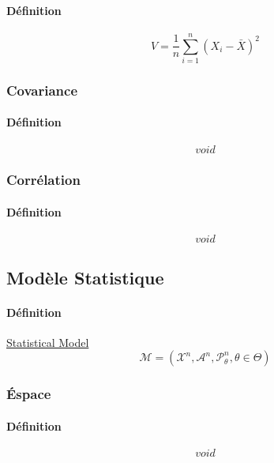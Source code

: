 \documentclass{article}
\begin{document}
\paragraph{Définition}
\begin{equation}
    \boxed{
        V = \frac{1}{n} \sum^{n}_{i=1} (X_{i} - \bar{X})^{2}
    }
\end{equation}

\subsubsection{Covariance}
\paragraph{Définition}
\begin{equation}
    \boxed{
        void
    }
\end{equation}

\subsubsection{Corrélation}
\paragraph{Définition}
\begin{equation}
    \boxed{
        void
    }
\end{equation}


\subsection{Modèle Statistique}
\paragraph{Définition} \href{https://en.wikipedia.org/wiki/Statistical_model}{Statistical Model}
\begin{equation}
    \boxed{
        \mathcal{M} = (\mathcal{X}^{n}, \mathcal{A}^{n}, \mathcal{P}^{n}_{\theta}, \theta\in\Theta)
    }
\end{equation}

\subsubsection{Éspace}
\paragraph{Définition}
\begin{equation}
    \boxed{
        void
    }
\end{equation}
\end{document}
